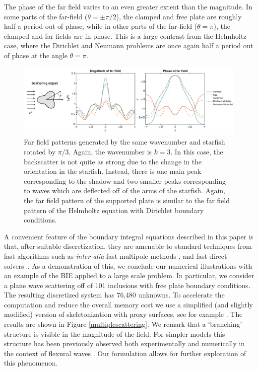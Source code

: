 \documentclass[preprint,12pt,3p]{elsarticle}
\begin{document}
The phase of the far field varies to an even greater extent than the magnitude. In some parts of the far-field ($\theta = \pm \pi/2$), the clamped and free plate are roughly half a period out of phase, while in other parts of the far-field ($\theta = \pi$), the clamped and far fields are in phase. This is a large contrast from the Helmholtz case, where the Dirichlet and Neumann problems are once again half a period out of phase at the angle $\theta = \pi$. 

\begin{figure}[ht]
\hspace{-1cm}\includegraphics[scale=0.5]{far_field_starfish3arm_2_edited.pdf}
\caption{Far field patterns generated by the same wavenumber and starfish rotated by $\pi/3$. Again, the wavenumber is $k = 3$. In this case, the backscatter is not quite as strong due to the change in the orientation in the starfish. Instead, there is one main peak corresponding to the shadow and two smaller peaks corresponding to waves which are deflected off of the arms of the starfish. Again, the far field pattern of the supported plate is similar to the far field pattern of the Helmholtz equation with Dirichlet boundary conditions. }\label{farfield2}
\end{figure}

A convenient feature of the boundary integral equations described in this paper is that, after suitable discretization, they are amenable to standard techniques from fast algorithms such as {\it inter alia} fast multipole methods \cite{fmm,fmm1,fmm2,fmm3,fmm4,fmm6,fmm7,fmm8}, and fast direct solvers~\cite{darve2013jsc,aminfar2016fast,hackbusch2000,hackbusch2002,hackbusch2002anm,darve2013jsc,gu2001,sheng2007,gu2007,xia2009,dewilde2010,martinsson2019fast,fds1,fds2,fds3,fds4,fds5,fds6,fds7,fds8,marple2016fast,rss,bremer2015high,gopal2022accelerated}. As a demonstration of this, we conclude our numerical illustrations with an example of the BIE applied to a large scale problem. In particular, we consider a plane wave scattering off of 101 inclusions with free plate boundary  
conditions. The resulting discretized system has 76,480 unknowns. To accelerate the computation and reduce the overall memory cost we use a simplified (and slightly modified) version of skeletonization with proxy surfaces, see for example \cite{martinsson2019fast}. The results are shown in Figure \ref{multiplescattering}. We remark that a `branching' structure is visible in the magnitude of the field. For simpler models this structure has been previously observed both experimentally and numerically in the context of flexural waves \cite{Jose2022, Jose2023, matula1995energy, Darabi2018}. Our formulation allows for further exploration of this phenomenon.
\end{document}
